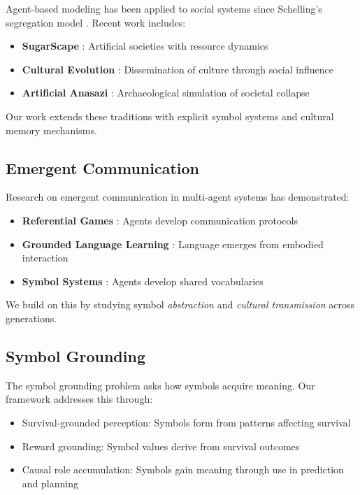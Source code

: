 \documentclass[11pt,a4paper]{article}
\begin{document}
Agent-based modeling has been applied to social systems since Schelling's segregation model \cite{schelling1971}. Recent work includes:

\begin{itemize}
    \item \textbf{SugarScape} \cite{epstein1996}: Artificial societies with resource dynamics
    \item \textbf{Cultural Evolution} \cite{axelrod1997}: Dissemination of culture through social influence
    \item \textbf{Artificial Anasazi} \cite{axtell2002}: Archaeological simulation of societal collapse
\end{itemize}

Our work extends these traditions with explicit symbol systems and cultural memory mechanisms.

\subsection{Emergent Communication}

Research on emergent communication in multi-agent systems has demonstrated:

\begin{itemize}
    \item \textbf{Referential Games} \cite{lazaridou2016}: Agents develop communication protocols
    \item \textbf{Grounded Language Learning} \cite{hermann2017}: Language emerges from embodied interaction
    \item \textbf{Symbol Systems} \cite{bouchacourt2018}: Agents develop shared vocabularies
\end{itemize}

We build on this by studying symbol \textit{abstraction} and \textit{cultural transmission} across generations.

\subsection{Symbol Grounding}

The symbol grounding problem \cite{harnad1990} asks how symbols acquire meaning. Our framework addresses this through:

\begin{itemize}
    \item Survival-grounded perception: Symbols form from patterns affecting survival
    \item Reward grounding: Symbol values derive from survival outcomes
    \item Causal role accumulation: Symbols gain meaning through use in prediction and planning
\end{itemize}
\end{document}
